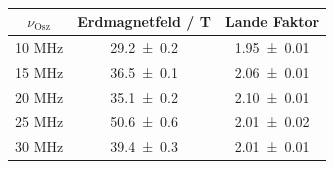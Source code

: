 \begin{table}
  \centering
  \caption{}
  \begin{tabular}{c|c c}
    \toprule
    	$\nu_\text{Osz}$ & Erdmagnetfeld / \mu T & Lande Faktor \\
    \midrule
       	10 MHz & \num{29.2 +- 0.2} & \num{1.95 +- 0.01} \\
	15 MHz & \num{36.5 +- 0.1} & \num{2.06 +- 0.01} \\ 
	20 MHz & \num{35.1 +- 0.2} & \num{2.10 +- 0.01} \\
	25 MHz & \num{50.6 +- 0.6} & \num{2.01 +- 0.02} \\
	30 MHz & \num{39.4 +- 0.3} & \num{2.01 +- 0.01} \\
    \bottomrule
  \end{tabular}
  \label{tab:}
\end{table}

